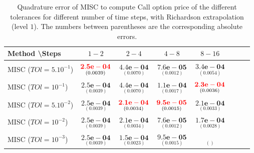 \documentclass[11pt]{article}
\begin{document}
\begin{table}[h!]
	\centering
	\begin{tabular}{l*{6}{c}r}
		Method \textbackslash  Steps            & $1-2$ & $2-4$ & $4-8$ & $8-16$  \\
		\hline
		MISC ($TOl=5.10^{-1}$)  & $\underset{(0.0039
			)}{\mathbf{ {\color{red}2.5e-04}}}$ & $\underset{(0.0070)}{\mathbf{4.4e-04}}$  & $\underset{(0.0012
			)}{\mathbf{7.6e-05}}$ &$\underset{(0.0054)}{\mathbf{3.4e-04}}$ \\
		MISC ($TOl=10^{-1}$)   & $\underset{(0.0039
			)}{\mathbf{ 2.5e-04}}$ & $\underset{(0.0070)}{\mathbf{4.4e-04}}$  & $\underset{(  0.0017)}{\mathbf{1.1e-04}}$ &$\underset{(0.0036)}{\mathbf{{\color{red}2.3e-04}}}$ \\
		MISC ($TOl=5.10^{-2}$)  & $\underset{(0.0039
			)}{\mathbf{ 2.5e-04}}$ & $\underset{(0.0034)}{\mathbf{{\color{red}{\color{red}2.1e-04}}}}$  & $\underset{(    0.0015)}{\mathbf{{\color{red}9.5e-05}}}$ &$\underset{(0.0033)}{\mathbf{2.1e-04}}$ \\
		MISC ($TOl=10^{-2}$)  & $\underset{(0.0039
			)}{\mathbf{ 2.5e-04}}$ & $\underset{(0.0034)}{\mathbf{2.1e-04}}$  & $\underset{(0.0012
			)}{\mathbf{7.6e-05}}$&$\underset{(0.0028
			)}{\mathbf{1.7e-04}}$ \\
		MISC ($TOl=10^{-3}$)  & $\underset{(0.0039
			)}{\mathbf{ 2.5e-04}}$ & $\underset{(0.0023
			)}{\mathbf{1.5e-04}}$   &$\underset{(    0.0015)}{\mathbf{9.5e-05}}$ & $\underset{()}{\mathbf{}}$ \\
		
		\hline
	\end{tabular}
	\caption{Quadrature error of MISC to compute Call option price of the different tolerances for different number of time steps, with Richardson extrapolation (level $1$). The numbers between parentheses are the corresponding absolute errors.}
	\label{Quadrature error of MISC to compute Call option price of the different tolerances for different number of time steps, with Richardson extrapolation (level $1$). The numbers between parentheses are the corresponding absolute errors.}
\end{table}
\end{document}
